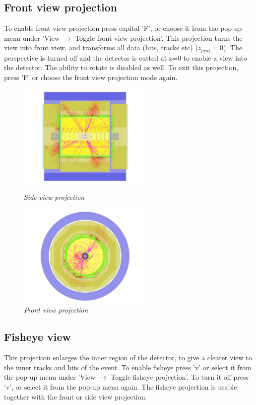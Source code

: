 \documentclass[a4paper,10pt]{article}
\begin{document}
\subsection{Front view projection}
To enable front view projection press capital 'F', or choose it from the pop-up menu under 'View $\rightarrow$ Toggle front view projection'. This projection turns the view into front view, and transforms all data (hits, tracks etc)
($z_{proj} = 0$). The perspective is turned off and the detector is cutted at z=0 to enable a view into the detector. The ability to rotate is disabled as well. To exit this projection, press 'F' or choose the front view projection mode again. 

\begin{figure}[h!]
\begin{minipage}[t]{6cm}
\centerline{\includegraphics[height=5cm]{sideview2.png}}
\caption{\label{CEDViewer} \textsl{Side view projection}}
\end{minipage}
\hfill
\begin{minipage}[t]{6cm}
\setlength{\fboxsep}{0mm}
\centerline{\includegraphics[height=5cm]{frontview2.png}}
\caption{\label{DSTViewer}\textsl{Front view projection}}
\end{minipage}
\end{figure}

\subsection{Fisheye view}
This projection enlarges the inner region of the detector, to give a clearer view to the inner tracks and hits of the event. To enable fisheye press 'v' or select it from the pop-up menu under 'View $\rightarrow$ Toggle fisheye projection'. To turn it off press 'v', or select it from the pop-up menu again. The fisheye projection is usable together with the front or side view projection.
\end{document}
